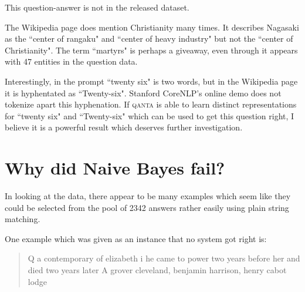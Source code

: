 \documentclass[12pt]{article}
\begin{document}
This question-answer is not in the released dataset.

The Wikipedia page does mention Christianity many times.
It describes Nagasaki as the ``center of rangaku" and ``center of heavy industry"
but not the ``center of Christianity".
The term ``martyrs" is perhaps a giveaway, even through it appears with 47 entities
in the question data.


Interestingly, in the prompt ``twenty six" is two words, but in the Wikipedia
page it is hyphentated as ``Twenty-six".
Stanford CoreNLP's online demo does not tokenize apart this hyphenation.
If \textsc{qanta} is able to learn distinct representations for ``twenty six" and ``Twenty-six"
which can be used to get this question right, I believe it is a powerful result which deserves
further investigation.



 
% 
% 



\section{Why did Naive Bayes fail?}
In looking at the data, there appear to be many examples which
seem like they could be selected from the pool of 2342 answers
rather easily using plain string matching.

One example which was given as an instance that no system got
right is:
\begin{quote}
Q a contemporary of elizabeth i he came to power
  two years before her and died two years later
A grover cleveland, benjamin harrison, henry cabot lodge
\end{quote}
\end{document}

